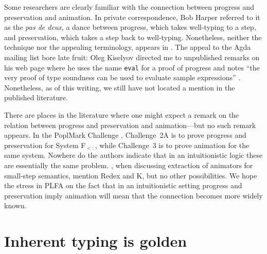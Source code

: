 \documentclass[preprint,authoryear]{elsarticle}
\begin{document}
Some researchers are clearly familiar with the connection between
progress and preservation and animation.  In private correspondence,
Bob Harper referred to it as the \emph{pas de deux}, a dance between
progress, which takes well-typing to a step, and preservation, which
takes a step back to well-typing.  Nonetheless, neither the technique
nor the appealing terminology, appears in \citet{Harper-2016}.  The
appeal to the Agda mailing list bore late fruit: Oleg Kiselyov
directed me to unpublished remarks on his web page where he uses the
name \texttt{eval} for a proof of progress and notes ``the very proof
of type soundness can be used to evaluate sample expressions''
\citep{Kiselyov-2009}.  Nonetheless, as of this writing, we still have
not located a mention in the published literature.

There are places in the literature where one might expect a remark on
the relation between progress and preservation and animation---but no
such remark appears.  In the PoplMark Challenge
\citep{Ayedemir-et-al-2005}, Challenge~2A is to prove progress and
preservation for System F$_{<:}$, while Challenge~3 is to prove
animation for the same system. Nowhere do the authors indicate that in
an intuitionistic logic these are essentially the same problem.
\cite{Owens-et-al-2016}, when discussing extraction of animators for
small-step semantics, mention Redex and K, but no other possibilities.
We hope the stress in PLFA on the fact that in an intuitionistic
setting progress and preservation imply animation will mean that the
connection becomes more widely known.






\section{Inherent typing is golden}
\end{document}
